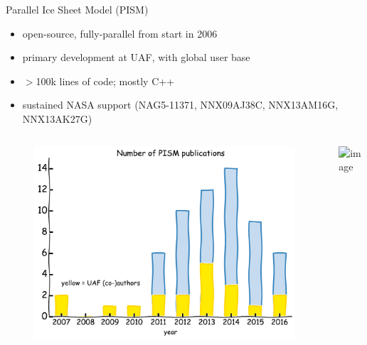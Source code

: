 \documentclass[hide notes,intlimits]{beamer}
\begin{document}
{
%
}


\begin{frame}{Parallel Ice Sheet Model (PISM)}
  \begin{itemize}
  \item open-source, fully-parallel from start in 2006
  \item primary development at UAF, with global user base
  \item $>$100k lines of code; mostly C++
  \item sustained NASA support \tiny (NAG5-11371, NNX09AJ38C, NNX13AM16G, NNX13AK27G)
  \end{itemize}
  \begin{columns}
    \column[c]{4.75cm}
    \begin{figure}
      \includegraphics[width=\textwidth]{pism-uaf-publications}
    \end{figure}
    \column[c]{6.25cm}
    \includegraphics<1>[width=\textwidth]{pism-users}
  \end{columns}
\end{frame}
\end{document}
